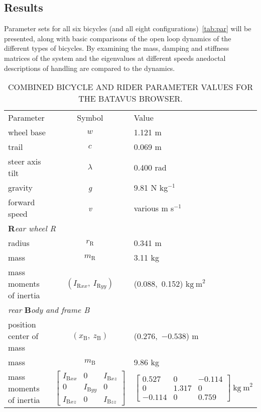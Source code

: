 \documentclass{bmd2010a}
\begin{document}
\subsection*{Results}
Parameter sets for all six bicycles (and all eight
configurations)~\ref{tab:par}  will be
presented, along with basic comparisons of the open loop dynamics of the
different types of bicycles. By examining the mass, damping and stiffness
matrices of the system and the eigenvalues at different speeds anedoctal
descriptions of handling are compared to the dynamics.
\begin{table*}[tb]
\centering
\caption{COMBINED BICYCLE AND RIDER PARAMETER VALUES FOR THE BATAVUS BROWSER.}
{\small
\begin{tabular}{lcl}
&&\\
\hline
Parameter & Symbol & Value \\
\hline
wheel base & $w$ & 1.121 m \\
trail & $c$ & 0.069 m \\
steer axis tilt & \emph{$\lambda$} & 0.400 rad \\
gravity & \emph{g} & 9.81 N kg$^{-1}$ \\
forward speed & \emph{v} & various m s$^{-1}$ \\

\multicolumn{3}{l}{\textbf{R}\emph{ear wheel R}}\\
radius & \emph{$r_\mathrm{R}$} & 0.341 m\\
mass & \emph{$m_\mathrm{R}$} &  3.11 kg \\
mass moments of inertia & \emph{$(I_{\mathrm{R}xx},\
I_{\mathrm{R}yy})$} &
(0.088,\ 0.152) $\mathrm{kg\ m}^2$ \\

\multicolumn{3}{l}{\emph{rear} \textbf{B}\emph{ody and frame B}}\\
position center of mass & \emph{$(x_\mathrm{B},\ z_\mathrm{B})$} &
($0.276$,\ $-0.538$) m\\
mass & \emph{$m_\mathrm{B}$} & 9.86 kg \\
mass moments of inertia & $\left[ \begin{array}{ccc}
I_{\mathrm{B}xx} &  0 & I_{\mathrm{B}xz}\\
0 & I_{\mathrm{B}yy} & 0 \\
I_{\mathrm{B}xz} & 0 & I_{\mathrm{B}zz}
\end{array} \right] $ &
$\left[ \begin{array}{ccc}
0.527 &  0 & -0.114\\
0 & 1.317 & 0 \\
-0.114 & 0 & 0.759
\end{array} \right] \ \mathrm{kg\ m}^{2}$\\


\end{tabular}}
\end{table*}
\end{document}

